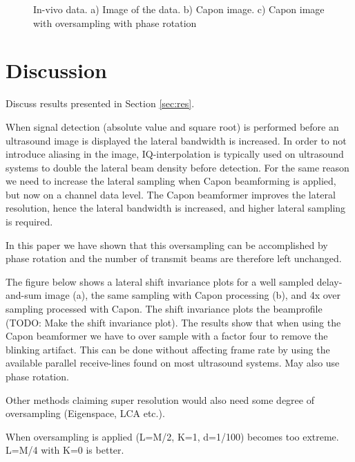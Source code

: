 \documentclass[journal]{IEEEtran}
\newcommand{\img}{img/}
\begin{document}
\begin{figure*}[!t]
\centerline{
\hfill{}
\hfill{}
}
\caption{In-vivo data. a) Image of the data. b) Capon image. c) Capon image with oversampling with phase rotation}
\label{fig:das}
\end{figure*}

\section{Discussion}\label{sec:dis}
Discuss results presented in Section \ref{sec:res}.

When signal detection (absolute value and square root) is performed before an ultrasound image is displayed the lateral bandwidth is increased. In order to not introduce aliasing in the image, IQ-interpolation is typically used on ultrasound systems to double the lateral beam density before detection. For the same reason we need to increase the lateral sampling when Capon beamforming is applied, but now on a channel data level. The Capon beamformer improves the lateral resolution, hence the lateral bandwidth is increased, and higher lateral sampling is required. 

In this paper we have shown that this oversampling can be accomplished by phase rotation and the number of transmit beams are therefore left unchanged. 

The figure below shows a lateral shift invariance plots for a well sampled delay-and-sum image (a), the same sampling with Capon processing (b), and 4x over sampling processed with Capon. The shift invariance plots the beamprofile (TODO: Make the shift invariance plot). The results show that when using the Capon beamformer we have to over sample with a factor four to remove the blinking artifact. This can be done without affecting frame rate by using the available parallel receive-lines found on most ultrasound systems. May also use phase rotation. 

Other methods claiming super resolution would also need some degree of oversampling (Eigenspace, LCA etc.). 

When oversampling is applied (L=M/2, K=1, d=1/100) becomes too extreme. L=M/4 with K=0 is better. 
\end{document}
